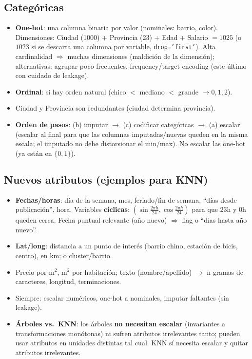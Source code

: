 \documentclass[10pt,a4paper]{article}
\begin{document}
\subsection{Categóricas}
\begin{itemize}
  \item \textbf{One-hot}: una columna binaria por valor (nominales: barrio, color). Dimensiones: Ciudad (1000) + Provincia (23) + Edad + Salario $=1025$ (o $1023$ si se descarta una columna por variable, \texttt{drop='first'}). Alta cardinalidad $\Rightarrow$ muchas dimensiones (maldición de la dimensión); alternativas: agrupar poco frecuentes, frequency/target encoding (este último con cuidado de leakage).
  \item \textbf{Ordinal}: si hay orden natural (chico $<$ mediano $<$ grande $\to0,1,2$).
  \item Ciudad y Provincia son redundantes (ciudad determina provincia).
  \item \textbf{Orden de pasos}: (b) imputar $\to$ (c) codificar categóricas $\to$ (a) escalar (escalar al final para que las columnas imputadas/nuevas queden en la misma escala; el imputado no debe distorsionar el min/max). No escalar las one-hot (ya están en $\{0,1\}$).
\end{itemize}

\subsection{Nuevos atributos (ejemplos para KNN)}
\begin{itemize}
  \item \textbf{Fechas/horas}: día de la semana, mes, feriado/fin de semana, ``días desde publicación'', hora. Variables \textbf{cíclicas}: $(\sin\frac{2\pi h}{24},\cos\frac{2\pi h}{24})$ para que 23h y 0h queden cerca. Fecha puntual relevante (año nuevo) $\Rightarrow$ flag o ``días hasta año nuevo''.
  \item \textbf{Lat/long}: distancia a un punto de interés (barrio chino, estación de bicis, centro), en km; o cluster/barrio.
  \item Precio por m$^2$, m$^2$ por habitación; texto (nombre/apellido) $\to$ n-gramas de caracteres, longitud, terminaciones.
  \item Siempre: escalar numéricos, one-hot a nominales, imputar faltantes (sin leakage).
  \item \textbf{Árboles vs.\ KNN}: los árboles \textbf{no necesitan escalar} (invariantes a transformaciones monótonas) ni sufren atributos irrelevantes tanto; pueden usar atributos en unidades distintas tal cual. KNN sí necesita escalar y quitar atributos irrelevantes.
\end{itemize}
\end{document}
